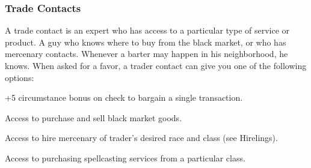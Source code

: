 \subsubsection{Trade Contacts}
A trade contact is an expert who has access to a particular type of service or product. A guy who knows where to buy from the black market, or who has mercenary contacts. Whenever a barter may happen in his neighborhood, he knows. When asked for a favor, a trader contact can give you one of the following options:

\begin{itemize*}
\item +5 circumstance bonus on  check to bargain a single transaction.
\item Access to purchase and sell black market goods.
\item Access to hire mercenary of trader's desired race and class (see Hirelings).
\item Access to purchasing spellcasting services from a particular class.
\end{itemize*}